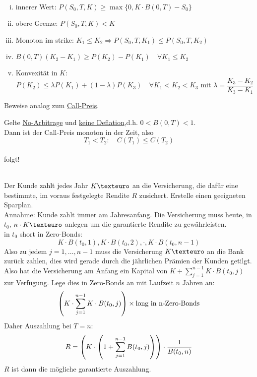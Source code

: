 \\
\begin{enumerate}[(i)]
	\item innerer Wert: $P(S_0,T,K)\ge \max\{0,K\cdot B(0,T)-S_0\}$
	\item obere Grenze: $P(S_0,T,K)<K$
	\item Monoton im strike: $K_1\le K_2\Rightarrow P(S_0,T,K_1)\le P(S_0,T,K_2)$
	\item $B(0,T)(K_2-K_1)\ge P(K_2)-P(K_1)\quad \forall K_1\le K_2$
	\item Konvexität in $K$: 
	\[ P(K_2)\le \lambda P(K_1)+(1-\lambda)P(K_3)\quad \forall K_1<K_2<K_3\text{ mit } \lambda=\frac{K_3-K_2}{K_3-K_1} \]
\end{enumerate}
Beweise analog zum \hyperref[sub:call-preis]{Call-Preis}.

Gelte \uline{No-Arbitrage} und \uline{keine Deflation},d.h. $0<B(0,T)<1$.\\
Dann ist der Call-Preis monoton in der Zeit, also \[ T_1<T_2:\quad C(T_1)\le C(T_2) \]
\\
folgt!

\\
Der Kunde zahlt jedes Jahr $K \texteuro$ an die Versicherung, die dafür eine bestimmte, im voraus festgelegte Rendite $R$ zusichert. Erstelle einen geeigneten Sparplan.\\
Annahme: Kunde zahlt immer am Jahresanfang. Die Versicherung muss heute, in $t_0$, $n\cdot K \texteuro$ anlegen um die garantierte Rendite zu gewährleisten.\\
in $t_0$ short in Zero-Bonds: \[ K\cdot B(t_0,1), K\cdot B(t_0,2), \cdot, K\cdot B(t_0,n-1) \]
Also zu jedem $j=1,\dots,n-1$ muss die Versicherung $K\texteuro$ an die Bank zurück zahlen, dies wird gerade durch die jährlichen Prämien der Kunden getilgt.\\
Also hat die Versicherung am Anfang ein Kapital von $K+\sum_{j=1}^{n-1}K\cdot B(t_0,j)$ zur Verfügung. Lege dies in Zero-Bonds an mit Laufzeit $n$ Jahren an: \[ \left( K\cdot \sum_{j=1}^{n-1}K\cdot B(t_0,j)\right)\times \text{long in n-Zero-Bonds} \]
Daher Auszahlung bei $T=n$: \[ R=\left( K\cdot \left( 1+\sum_{j=1}^{n-1}B(t_0,j)\right)\right)\cdot \frac{1}{B(t_0,n)} \]
$R$ ist dann die mögliche garantierte Auszahlung.